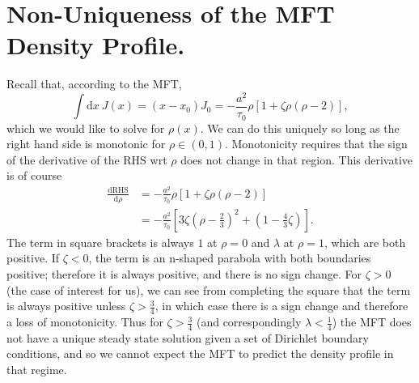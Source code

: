 \documentclass[
reprint, amsmath,amssymb, aps,
 pre, longbibliography,
]{revtex4-1}
\begin{document}
\section{Non-Uniqueness of the MFT Density Profile.}
Recall that, according to the MFT,
\begin{equation}
 \int \! \!  \mathrm{d}x \ J(x) = (x-x_0)J_0 = -\frac{a^2}{\tau_0} \rho \left[1+\zeta \rho\left(\rho-2\right)\right], \label{cubic}
\end{equation}
which we would like to solve for $\rho(x)$. We can do this uniquely so long as the right hand side is monotonic for $\rho \in (0, 1)$. Monotonicity requires that the sign of the derivative of the RHS wrt $\rho$ does not change in that region.
This derivative is of course
\begin{align}
 \frac{\mathrm{d} \mathrm{RHS}}{\mathrm{d} \rho} &= -\frac{a^2}{\tau_0} \rho \left[1+\zeta \rho\left(\rho-2\right)\right] \\
 &= -\frac{a^2}{\tau_0} \left[ 3 \zeta (\rho-\frac{2}{3})^2 + (1-\frac{4}{3} \zeta) \right].
\end{align}
The term in square brackets is always $1$ at $\rho=0$ and $\lambda$ at $\rho=1$, which are both positive.
If $\zeta<0$, the term is an n-shaped parabola with both boundaries positive; therefore it is always positive, and there is no sign change.
For $\zeta>0$ (the case of interest for us), we can see from completing the square that the term is always positive unless $\zeta > \frac{3}{4}$, in which case there is a sign change and therefore a loss of monotonicity.
Thus for $\zeta > \frac{3}{4}$ (and correspondingly $\lambda<\frac{1}{4}$) the MFT does not have a unique steady state solution given a set of Dirichlet boundary conditions, and so we cannot expect the MFT to predict the density profile
in that regime.
\end{document}
